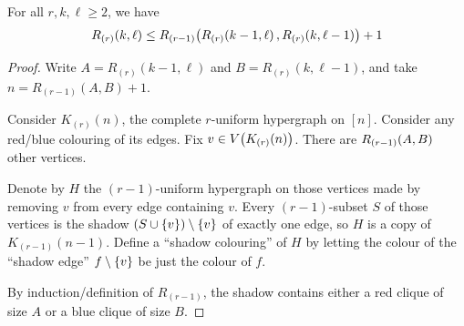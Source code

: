 \begin{boxtheorem} \label{Ch6:Thm:Hypergraph_Ramsey_Recursion}
    For all $r, k, \ell \geq 2$, we have
    \begin{align*}
        R_{(r)}(k, \ell) \le R_{(r - 1)}\!\left( R_{(r)}\!\left( k - 1, \ell \right), R_{(r)}\!\left( k, \ell - 1 \right) \right) + 1
    \end{align*}
\end{boxtheorem}
\begin{proof}
    Write $A = R_{(r)}(k - 1, \ell)$ and $B = R_{(r)}(k, \ell - 1)$, and take $n = R_{(r - 1)}(A, B) + 1$.

    Consider $K_{(r)}(n)$, the complete $r$-uniform hypergraph on $[n]$. Consider any red/blue colouring of its edges. Fix $v \in V\!\left( K_{(r)}(n) \right)$. There are $R_{(r - 1)}\!\left( A, B \right)$ other vertices.

    Denote by $H$ the $(r - 1)$-uniform hypergraph on those vertices made by removing $v$ from every edge containing $v$. Every $(r - 1)$-subset $S$ of those vertices is the shadow $\left( S \cup \left\{ v \right\} \right) \setminus \left\{ v \right\}$ of exactly one edge, so $H$ is a copy of $K_{(r - 1)}(n - 1)$. Define a ``shadow colouring'' of $H$ by letting the colour of the ``shadow edge'' $f \setminus \left\{ v \right\}$ be just the colour of $f$.

    By induction/definition of $R_{(r - 1)}$, the shadow contains either a red clique of size $A$ or a blue clique of size $B$.


\end{proof}

